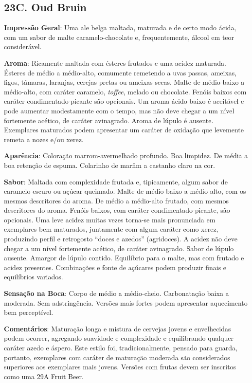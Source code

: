 \subsection*{23C. Oud Bruin}
\textbf{Impressão Geral}: Uma ale belga maltada, maturada e de certo modo ácida, com um sabor de malte caramelo-chocolate e, frequentemente, álcool em teor considerável.

\textbf{Aroma}: Ricamente maltada com ésteres frutados e uma acidez maturada. Ésteres de médio a médio-alto, comumente remetendo a uvas passas, ameixas, figos, tâmaras, laranjas, cerejas pretas ou ameixas secas. Malte de médio-baixo a médio-alto, com caráter caramelo, \textit{toffee}, melado ou chocolate. Fenóis baixos com caráter condimentado-picante são opcionais. Um aroma ácido baixo é aceitável e pode aumentar modestamente com o tempo, mas não deve chegar a um nível fortemente acético, de caráter avinagrado. Aroma de lúpulo é ausente. Exemplares maturados podem apresentar um caráter de oxidação que levemente remeta a nozes e/ou xerez.

\textbf{Aparência}: Coloração marrom-avermelhado profundo. Boa limpidez. De média a boa retenção de espuma. Colarinho de marfim a castanho claro na cor.

\textbf{Sabor}: Maltada com complexidade frutada e, tipicamente, algum sabor de caramelo escuro ou açúcar queimado. Malte de médio-baixo a médio-alto, com os mesmos descritores do aroma. De médio a médio-alto frutado, com mesmos descritores do aroma. Fenóis baixos, com caráter condimentado-picante, são opcionais. Uma leve acidez muitas vezes torna-se mais pronunciada em exemplares bem maturados, juntamente com algum caráter como xerez, produzindo perfil e retrogosto “doces e azedos” (agridoces). A acidez não deve chegar a um nível fortemente acético, de caráter avinagrado. Sabor de lúpulo ausente. Amargor de lúpulo contido. Equilíbrio para o malte, mas com frutado e acidez presentes. Combinações e fonte de açúcares podem produzir finais e equilíbrios variados.

\textbf{Sensação na Boca}: Corpo de médio a médio-cheio. Carbonatação baixa a moderada. Sem adstringência. Versões mais fortes podem apresentar aquecimento bem perceptível.

\textbf{Comentários}: Maturação longa e mistura de cervejas jovens e envelhecidas podem ocorrer, agregando suavidade e complexidade e equilibrando qualquer caráter azedo e áspero. Este estilo foi, tradicionalmente, pensado para guarda, portanto, exemplares com caráter de maturação moderada são considerados superiores aos exemplares mais jovens. Versões com frutas devem ser inscritos como uma 29A Fruit Beer.

